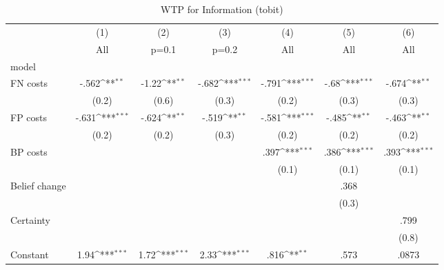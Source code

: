 \begin{table}[H]\centering
\def\sym#1{\ifmmode^{#1}\else\(^{#1}\)\fi}
\caption{WTP for Information (tobit)}
\begin{tabular}{l*{6}{c}}
\hline\hline
                &\multicolumn{1}{c}{(1)}&\multicolumn{1}{c}{(2)}&\multicolumn{1}{c}{(3)}&\multicolumn{1}{c}{(4)}&\multicolumn{1}{c}{(5)}&\multicolumn{1}{c}{(6)}\\
                &\multicolumn{1}{c}{All}&\multicolumn{1}{c}{p=0.1}&\multicolumn{1}{c}{p=0.2}&\multicolumn{1}{c}{All}&\multicolumn{1}{c}{All}&\multicolumn{1}{c}{All}\\
\hline
model           &                  &                  &                  &                  &                  &                  \\
FN costs        &    -.562\sym{**} &    -1.22\sym{**} &    -.682\sym{***}&    -.791\sym{***}&     -.68\sym{***}&    -.674\sym{**} \\
                &    (0.2)         &    (0.6)         &    (0.3)         &    (0.2)         &    (0.3)         &    (0.3)         \\
FP costs        &    -.631\sym{***}&    -.624\sym{**} &    -.519\sym{**} &    -.581\sym{***}&    -.485\sym{**} &    -.463\sym{**} \\
                &    (0.2)         &    (0.2)         &    (0.3)         &    (0.2)         &    (0.2)         &    (0.2)         \\
BP costs        &                  &                  &                  &     .397\sym{***}&     .386\sym{***}&     .393\sym{***}\\
                &                  &                  &                  &    (0.1)         &    (0.1)         &    (0.1)         \\
Belief change   &                  &                  &                  &                  &     .368         &                  \\
                &                  &                  &                  &                  &    (0.3)         &                  \\
Certainty       &                  &                  &                  &                  &                  &     .799         \\
                &                  &                  &                  &                  &                  &    (0.8)         \\
Constant        &     1.94\sym{***}&     1.72\sym{***}&     2.33\sym{***}&     .816\sym{**} &     .573         &    .0873         \\

\end{tabular}
\end{table}
